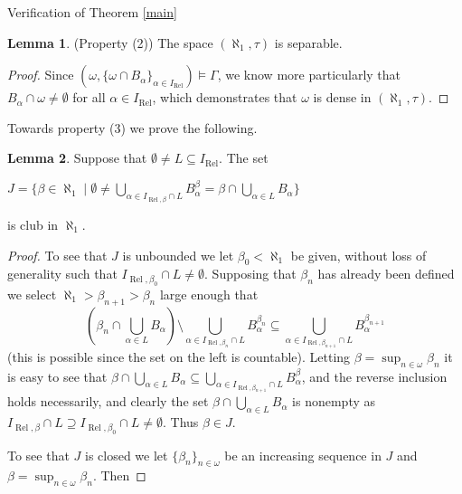 \documentclass{amsart}
\theoremstyle{definition}\newtheorem{theorem}{Theorem}
\theoremstyle{definition}\newtheorem{bigtheorem}{Theorem}
\numberwithin{theorem}{section}
\theoremstyle{definition}\newtheorem{corollary}[theorem]{Corollary}
\theoremstyle{definition}\newtheorem{proposition}[theorem]{Proposition}
\theoremstyle{definition}\newtheorem{definition}[theorem]{Definition}
\theoremstyle{definition}\newtheorem{question}[theorem]{Question}
\theoremstyle{definition}\newtheorem{example}[theorem]{Example}
\theoremstyle{definition}\newtheorem{remark}[theorem]{Remark}
\theoremstyle{definition}\newtheorem{note}[theorem]{Note}
\theoremstyle{definition}\newtheorem{lemma}[theorem]{Lemma}
\theoremstyle{definition}\newtheorem{fact}[theorem]{Fact}
\theoremstyle{definition}\newtheorem{define}[theorem]{Definition}
\theoremstyle{definition}\newtheorem{definitions}[theorem]{Definitions}
\theoremstyle{definition}\newtheorem{claim}[theorem]{Claim}
\theoremstyle{definition}\newtheorem{obs}[theorem]{Observation}
\theoremstyle{definition}\newtheorem{construction}[theorem]{Construction}
\newcommand{\Rel}{\operatorname{Rel}}
\begin{document}
\begin{section}{Verification of Theorem \ref{main}}
\begin{lemma}\label{separableindeed}(Property (2))  The space $(\aleph_1, \tau)$ is separable.
\end{lemma}

\begin{proof}  Since $(\omega, \{\omega \cap B_{\alpha}\}_{\alpha \in I_{\Rel}}) \models \Gamma$, we know more particularly that $B_{\alpha}\cap \omega \neq \emptyset$ for all $\alpha \in I_{\Rel}$, which demonstrates that $\omega$ is dense in $(\aleph_1, \tau)$.



\end{proof}

Towards property (3) we prove the following.

\begin{lemma} \label{opensetsaccumulate}  Suppose that $\emptyset \neq L \subseteq I_{\Rel}$.  The set 

\begin{center}
$J = \{\beta \in \aleph_1 \mid \emptyset \neq \bigcup_{\alpha \in I_{\Rel, \beta} \cap L} B_{\alpha}^{\beta} = \beta \cap \bigcup_{\alpha \in L} B_{\alpha}\}$
\end{center}

\noindent is club in $\aleph_1$.

\end{lemma}

\begin{proof}  To see that $J$ is unbounded we let $\beta_0 < \aleph_1$ be given, without loss of generality such that $I_{\Rel, \beta_0} \cap L \neq \emptyset$.  Supposing that $\beta_n$ has already been defined we select $\aleph_1 > \beta_{n + 1} > \beta_n$ large enough that $$(\beta_n \cap \bigcup_{\alpha \in L} B_{\alpha}) \setminus \bigcup_{\alpha \in I_{\Rel, \beta_n}\cap L} B_{\alpha}^{\beta_n} \subseteq \bigcup_{\alpha \in I_{\Rel, \beta_{n+ 1}} \cap L} B_{\alpha}^{\beta_{n+1}}$$ (this is possible since the set on the left is countable).  Letting $\beta = \sup_{n\in \omega} \beta_n$ it is easy to see that $\beta \cap \bigcup_{\alpha \in L} B_{\alpha} \subseteq  \bigcup_{\alpha \in I_{\Rel, \beta_{n+ 1}} \cap L} B_{\alpha}^{\beta}$, and the reverse inclusion holds necessarily, and clearly the set $\beta \cap \bigcup_{\alpha \in L} B_{\alpha}$ is nonempty as $I_{\Rel, \beta} \cap L \supseteq I_{\Rel, \beta_0} \cap L \neq \emptyset$.  Thus $\beta \in J$.

To see that $J$ is closed we let $\{\beta_n\}_{n\in \omega}$ be an increasing sequence in $J$ and $\beta = \sup_{n \in \omega} \beta_n$.  Then 



\end{proof}
\end{section}
\end{document}

